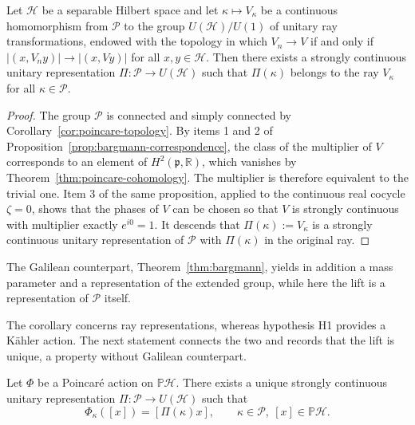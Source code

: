 \begin{corollary}\label{cor:poincare-lift}
	Let $\mathcal{H}$ be a separable Hilbert space and let $\kappa\mapsto V_\kappa$ be a continuous homomorphism from $\mathcal{P}$ to the group $U(\mathcal{H})/U(1)$ of unitary ray transformations, endowed with the topology in which $V_n\to V$ if and only if $|(x,V_ny)|\to|(x,Vy)|$ for all $x,y\in\mathcal{H}$. Then there exists a strongly continuous unitary representation $\Pi:\mathcal{P}\to U(\mathcal{H})$ such that $\Pi(\kappa)$ belongs to the ray $V_\kappa$ for all $\kappa\in\mathcal{P}$.
\end{corollary}

\begin{proof}
	The group $\mathcal{P}$ is connected and simply connected by Corollary~\ref{cor:poincare-topology}. By items 1 and 2 of Proposition~\ref{prop:bargmann-correspondence}, the class of the multiplier of $V$ corresponds to an element of $H^2(\mathfrak{p},\mathbb{R})$, which vanishes by Theorem~\ref{thm:poincare-cohomology}. The multiplier is therefore equivalent to the trivial one. Item 3 of the same proposition, applied to the continuous real cocycle $\zeta=0$, shows that the phases of $V$ can be chosen so that $V$ is strongly continuous with multiplier exactly $e^{i0}=1$. It descends that $\Pi(\kappa):=V_\kappa$ is a strongly continuous unitary representation of $\mathcal{P}$ with $\Pi(\kappa)$ in the original ray.
\end{proof}

\noindent The Galilean counterpart, Theorem~\ref{thm:bargmann}, yields in addition a mass parameter and a representation of the extended group, while here the lift is a representation of $\mathcal{P}$ itself.

The corollary concerns ray representations, whereas hypothesis H1 provides a Kähler action. The next statement connects the two and records that the lift is unique, a property without Galilean counterpart.

\begin{proposition}\label{prop:poincare-lift}
	Let $\Phi$ be a Poincar\'e action on $\mathbb{P}\mathcal{H}$. There exists a unique strongly continuous unitary representation $\Pi:\mathcal{P}\to U(\mathcal{H})$ such that
	\begin{equation}\label{eq:lift-def}
		\Phi_\kappa([x])=[\Pi(\kappa)x],\qquad \kappa\in\mathcal{P},\ [x]\in\mathbb{P}\mathcal{H}.
	\end{equation}
\end{proposition}

